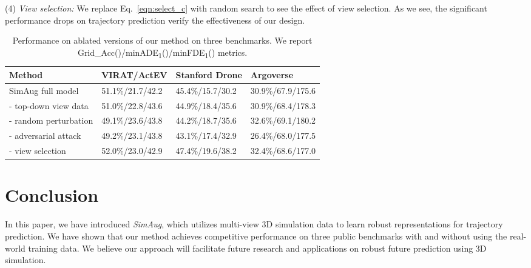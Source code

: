 \documentclass[runningheads]{eccv2020/llncs}
\newcommand{\fancyname}{SimAug}
\begin{document}
(4) \textit{View selection:} We replace Eq.~\eqref{eqn:select_c} with random search to see the effect of view selection. As we see, the significant performance drops on trajectory prediction verify the effectiveness of our design.



\begin{table}[]
\vspace{-4mm}
\centering
\caption{Performance on ablated versions of our method on three benchmarks. We report Grid\_Acc()/minADE\textsubscript{1}()/minFDE\textsubscript{1}() metrics.} 
\begin{tabular}{l C{28mm}C{28mm}C{28mm}}
\toprule
Method & VIRAT/ActEV   & Stanford Drone & Argoverse       \\
\midrule
SimAug full model&  51.1\%/21.7/42.2 &  45.4\%/15.7/30.2 & 30.9\%/67.9/175.6\\
\midrule
- top-down view data &  51.0\%/22.8/43.6 & 44.9\%/18.4/35.6 &  30.9\%/68.4/178.3\\ 
- random perturbation &  49.1\%/23.6/43.8 & 44.2\%/18.7/35.6  & 32.6\%/69.1/180.2 \\ 
- adversarial attack &  49.2\%/23.1/43.8 & 43.1\%/17.4/32.9 & 26.4\%/68.0/177.5 \\ 
- view selection &  52.0\%/23.0/42.9 & 47.4\%/19.6/38.2 & 32.4\%/68.6/177.0\\ 
\bottomrule
\end{tabular}
\label{table:ablation}
\vspace{-8mm}
\end{table} 
 

\section{Conclusion}
\label{sec:concl}
In this paper,
we have introduced \textit{\fancyname}, which utilizes multi-view 3D simulation data to learn robust representations for trajectory prediction.
We have shown that our method achieves competitive performance on three public benchmarks with and without using the real-world training data.
We believe our approach will facilitate future research and applications on robust future prediction using 3D simulation.

 
\clearpage


\end{document}
